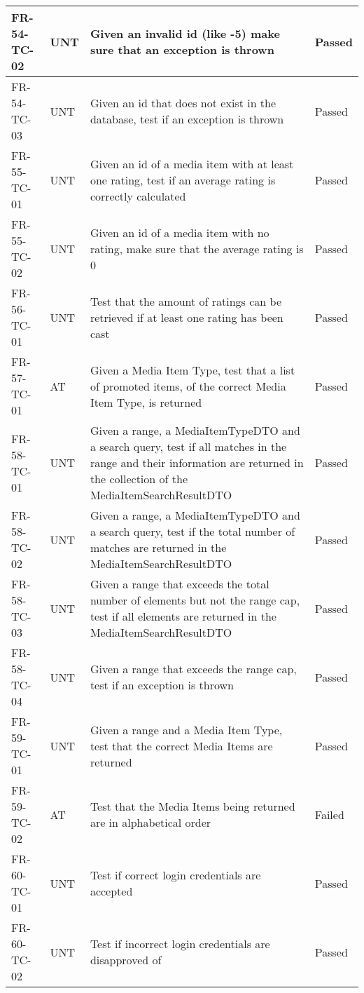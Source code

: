 \documentclass[../report.tex]{subfiles}
\begin{document}
\begin{longtable}{|L{2.1cm}|L{1cm}|L{12.4cm}|L{1.4cm}|}
FR-54-TC-02&UNT&Given an invalid id (like -5) make sure that an exception is thrown&Passed  \\ \hline
FR-54-TC-03&UNT&Given an id that does not exist in the database, test if an exception is thrown&Passed  \\ \hline
FR-55-TC-01&UNT&Given an id of a media item with at least one rating, test if an average rating is correctly calculated &Passed  \\ \hline
FR-55-TC-02&UNT&Given an id of a media item with no rating, make sure that the average rating is 0&Passed  \\ \hline
FR-56-TC-01&UNT&Test that the amount of ratings can be retrieved if at least one rating has been cast&Passed  \\ \hline
FR-57-TC-01&AT&Given a Media Item Type, test that a list of promoted items, of the correct Media Item Type, is returned&Passed  \\ \hline
FR-58-TC-01&UNT&Given a range, a MediaItemTypeDTO and a search query, test if all matches in the range and their information are returned in the collection of the MediaItemSearchResultDTO&Passed  \\ \hline
FR-58-TC-02&UNT&Given a range, a MediaItemTypeDTO and a search query, test if the total number of matches are returned in the MediaItemSearchResultDTO&Passed  \\ \hline
FR-58-TC-03&UNT&Given a range that exceeds the total number of elements but not the range cap, test if all elements are returned in the MediaItemSearchResultDTO&Passed  \\ \hline
FR-58-TC-04&UNT&Given a range that exceeds the range cap, test if an exception is thrown&Passed  \\ \hline
FR-59-TC-01&UNT&Given a range and a Media Item Type,  test that the correct Media Items are returned&Passed  \\ \hline
FR-59-TC-02&AT&Test that the Media Items being returned are in alphabetical order&Failed  \\ \hline
FR-60-TC-01&UNT&Test if correct login credentials are accepted&Passed  \\ \hline
FR-60-TC-02&UNT&Test if incorrect login credentials are disapproved of&Passed  \\ \hline

\end{longtable}
\end{document}
